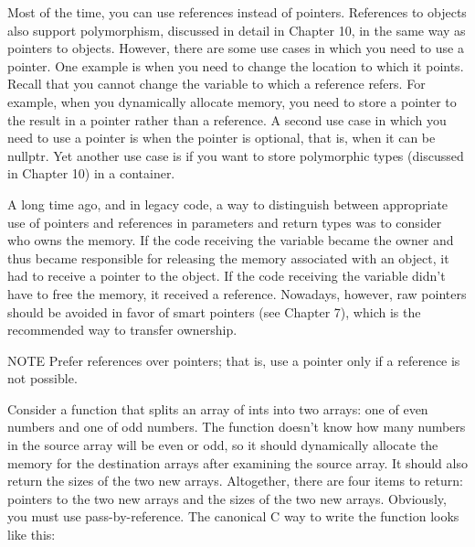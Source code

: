 Most of the time, you can use references instead of pointers. References to objects also support polymorphism, discussed in detail in Chapter 10, in the same way as pointers to objects. However, there are some use cases in which you need to use a pointer. One example is when you need to change the location to which it points. Recall that you cannot change the variable to which a reference refers. For example, when you dynamically allocate memory, you need to store a pointer to the result in a pointer rather than a reference. A second use case in which you need to use a pointer is when the pointer is optional, that is, when it can be nullptr. Yet another use case is if you want to store polymorphic types (discussed in Chapter 10) in a container.

A long time ago, and in legacy code, a way to distinguish between appropriate use of pointers and references in parameters and return types was to consider who owns the memory. If the code receiving the variable became the owner and thus became responsible for releasing the memory associated with an object, it had to receive a pointer to the object. If the code receiving the variable didn’t have to free the memory, it received a reference. Nowadays, however, raw pointers should be avoided in favor of smart pointers (see Chapter 7), which is the recommended way to transfer ownership.

\begin{myNotic}{NOTE}
Prefer references over pointers; that is, use a pointer only if a reference is not possible.
\end{myNotic}

Consider a function that splits an array of ints into two arrays: one of even numbers and one of odd numbers. The function doesn’t know how many numbers in the source array will be even or odd, so it should dynamically allocate the memory for the destination arrays after examining the source array. It should also return the sizes of the two new arrays. Altogether, there are four items to return: pointers to the two new arrays and the sizes of the two new arrays. Obviously, you must use pass-by-reference. The canonical C way to write the function looks like this:


